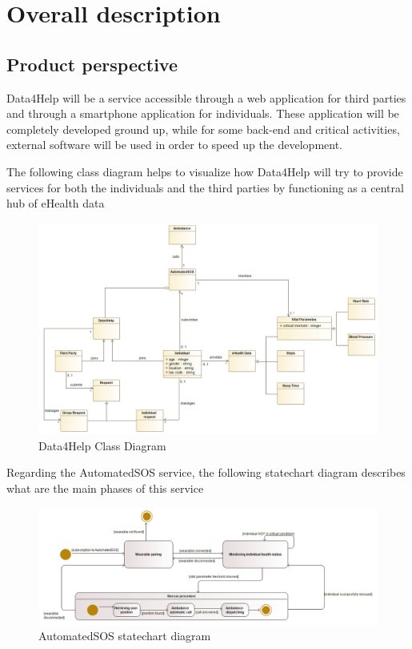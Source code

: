 \chapter{Overall description}
\section{Product perspective}
Data4Help will be a service accessible through a web application for third parties and through a smartphone application for individuals. These application will be completely developed ground up, while for some back-end and critical activities, external software will be used in order to speed up the development.


The following class diagram helps to visualize how Data4Help will try to provide services for both the individuals and the third parties by functioning as a central hub of eHealth data

\begin{figure}[H]
  \includegraphics[width=1.05\linewidth]{resources/UML/Data4HelpClassDiagram.png}
  \caption{Data4Help Class Diagram}
  \label{fig: Data4Help Class diagram}
\end{figure}

Regarding the AutomatedSOS service, the following statechart diagram describes what are the main phases of this service

\begin{figure}[H]
  \includegraphics[width=1.10\linewidth]{resources/UML/AutomatedSOSstatechart.png}
  \caption{AutomatedSOS statechart diagram}
  \label{fig: AutoamtedSOS statechart diagram}
\end{figure}


